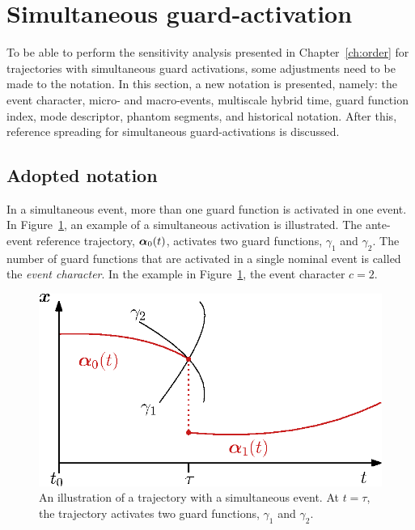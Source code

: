 \documentclass[../DC2017114Bouma.tex]{subfiles}
\begin{document}
\section{Simultaneous guard-activation}\label{sec:simguards}
To be able to perform the sensitivity analysis presented in Chapter~\ref{ch:order} for trajectories with simultaneous guard activations, some adjustments need to be made to the notation. In this section, a new notation \cite{Rijnen2018} is presented, namely: the event character, micro- and macro-events, multiscale hybrid time, guard function index, mode descriptor, phantom segments, and historical notation. After this, reference spreading for simultaneous guard-activations is discussed.

\subsection{Adopted notation}\label{sec:4not}
In a simultaneous event, more than one guard function is activated in one event. In Figure~\ref{fig:4simulexample}, an example of a simultaneous activation is illustrated. The ante-event reference trajectory, $\boldsymbol{\alpha}_0(t)$, activates two guard functions, $\gamma_1$ and $\gamma_2$. The number of guard functions that are activated in a single nominal event is called the \textit{event character}. In the example in Figure~\ref{fig:4simulexample}, the event character $c = 2$.

\begin{figure}[h]
\centering
\includegraphics[width=.45\textwidth]{simulexample.eps}\caption{An illustration of a trajectory with a simultaneous event. At $t=\tau$, the trajectory activates two guard functions, $\gamma_1$ and $\gamma_2$.} \label{fig:4simulexample}
\end{figure}
\end{document}
